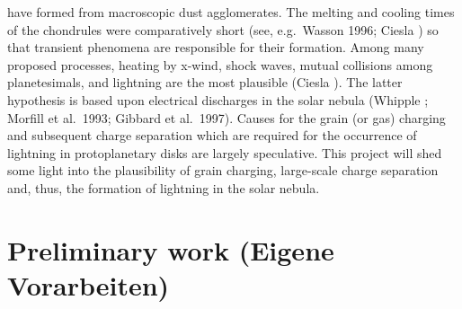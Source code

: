 have formed from macroscopic dust agglomerates. The melting and cooling
times of the chondrules were comparatively short (see, e.g.\ Wasson 1996;
Ciesla ) so that transient phenomena are responsible for their
formation. Among many proposed processes, heating by x-wind, shock waves,
mutual collisions among planetesimals, and lightning are the most plausible
(Ciesla ). The latter hypothesis is based upon electrical
discharges in the solar nebula (Whipple ; Morfill et al.~1993;
Gibbard et al.~1997).  Causes for the grain (or gas) charging and subsequent
charge separation which are required for the occurrence of lightning in
protoplanetary disks are largely speculative. This project will shed some
light into the plausibility of grain charging, large-scale charge separation
and, thus, the formation of lightning in the solar nebula.






\section{Preliminary work (Eigene Vorarbeiten)}

